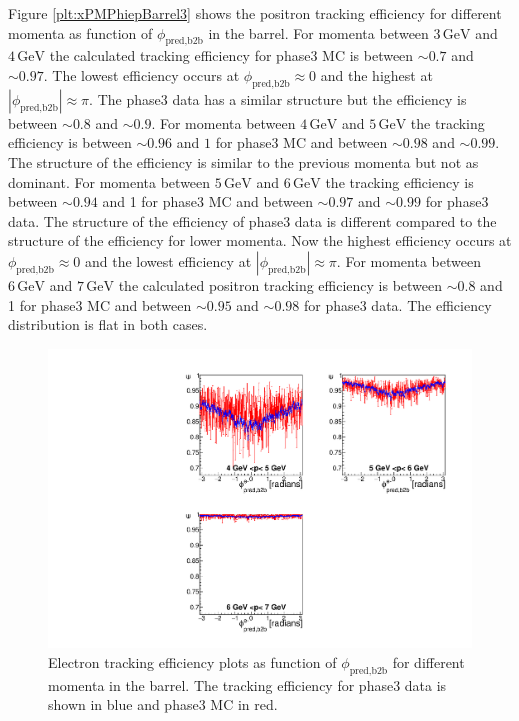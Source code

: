 \documentclass[a4paper,11pt,twosided,final,german,openbib,pdftex,listof=totoc,bibliography=totoc]{scrbook}
\begin{document}
Figure \ref{plt:xPMPhiepBarrel3} shows the positron tracking efficiency for different momenta as function of $\phi_{\textrm{pred,b2b}}$ in the barrel. 
For momenta between $3\,\textrm{GeV}$ and $4\,\textrm{GeV}$ the calculated tracking efficiency for phase3 MC is between $\sim 0.7$ and $\sim 0.97$. The lowest efficiency  occurs at $\phi_{\textrm{pred,b2b}} \approx 0$ and the highest at $|\phi_{\textrm{pred,b2b}}| \approx \pi$. The phase3 data has a similar structure but the efficiency is between $\sim 0.8$ and $\sim 0.9$.
For momenta between $4\,\textrm{GeV}$ and $5\,\textrm{GeV}$ the tracking efficiency is between $\sim 0.96$ and $1$ for phase3 MC and between $\sim 0.98$ and $\sim 0.99$. The structure of the efficiency is similar to the previous momenta but not as dominant.
For momenta between $5\,\textrm{GeV}$ and $6\,\textrm{GeV}$ the tracking efficiency is between $\sim 0.94$ and 1 for phase3 MC and between $\sim 0.97$ and $\sim 0.99$ for phase3 data. The structure of the efficiency of phase3 data is different compared to the structure of the efficiency for lower momenta. Now the highest efficiency occurs at $\phi_{\textrm{pred,b2b}} \approx 0$ and the lowest efficiency at $|\phi_{\textrm{pred,b2b}}| \approx \pi$.
For momenta between $6\,\textrm{GeV}$ and $7\,\textrm{GeV}$ the calculated positron tracking efficiency is  between $\sim 0.8$ and 1 for phase3 MC and between $\sim 0.95$ and $\sim 0.98$ for phase3 data. The efficiency distribution is flat in both cases.

\begin{figure}[!htbp]
	\centering
	\includegraphics[width=\textwidth]{Plots/master3/xPMPhiemBarrelP3}
	\caption[Momentum $\phi_{\textrm{pred,b2b}}$ Electron Barrel Efficiency Phase3]{Electron tracking efficiency plots as function of $\phi_{\textrm{pred,b2b}}$ for different momenta in the barrel. The tracking efficiency for phase3 data is shown in blue and phase3 MC in red.}
	\label{plt:xPMPhiemBarrel3}
\end{figure}
\end{document}
